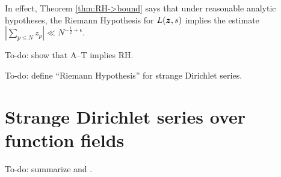 In effect, Theorem \ref{thm:RH->bound} says that under reasonable analytic 
hypotheses, the Riemann Hypothesis for $L({\boldsymbol z},s)$ implies the estimate 
$|\sum_{p\leqslant N} z_p| \ll N^{-\frac 1 2+\epsilon}$. 

To-do: show that A--T implies RH. 

To-do: define ``Riemann Hypothesis'' for strange Dirichlet series. 





\section{Strange Dirichlet series over function fields}

To-do: summarize \cite[Ch.~9]{katz-sarnak-1999} and 
\cite{niederreiter-1991}. 
